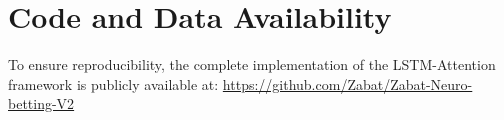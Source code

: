 \documentclass[3p,times,procedia]{elsarticle}
\begin{document}
\section*{Code and Data Availability}
\label{app:code-availability}

To ensure reproducibility, the complete implementation of the LSTM-Attention framework
is publicly available at: \url{https://github.com/Zabat/Zabat-Neuro-betting-V2}



\end{document}
